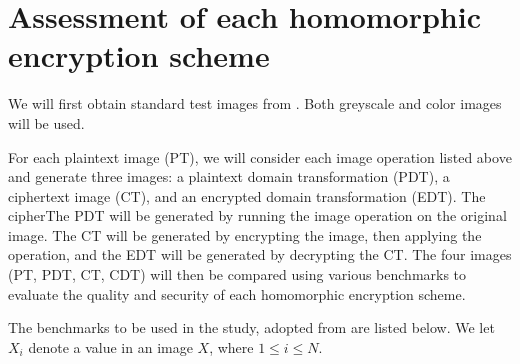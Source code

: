 \section{Assessment of each homomorphic encryption scheme}

We will first obtain standard test images from \cite{gonzalez_image_nodate}. Both greyscale and color images will be used.

For each plaintext image (PT), we will consider each image operation listed above and generate three images: a plaintext domain transformation (PDT), a ciphertext image (CT), and an encrypted domain transformation (EDT). The cipherThe PDT will be generated by running the image operation on the original image. The CT will be generated by encrypting the image, then applying the operation, and the EDT will be generated by decrypting the CT. The four images (PT, PDT, CT, CDT) will then be compared using various benchmarks to evaluate the quality and security of each homomorphic encryption scheme.

The benchmarks to be used in the study, adopted from \cite{ahmed_benchmark_2016, ahmad_efficiency_2012, wu_npcr_2011} are listed below. We let $X_i$ denote a value in an image $X$, where $1 \leq i \leq N$.

